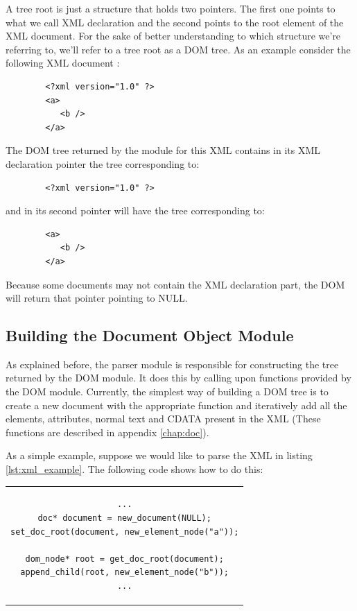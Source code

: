 \documentclass[a4paper]{report}
\begin{document}
	\pagebreak
	A tree root is just a structure that holds two pointers. The first one points to what we call XML declaration and the second points to the root element of the XML document. For the sake of better understanding to which
	structure we're referring to, we'll refer to a tree root as a DOM tree. As an example consider the following XML document	:
	
	\lstset{language=XML,caption=Sample XML file, captionpos=b}
	\begin{lstlisting}
		<?xml version="1.0" ?>
		<a>
		   <b />
		</a>
	\end{lstlisting}
	
	The DOM tree returned by the module for this XML contains in its XML declaration pointer the tree corresponding to:
	\lstset{language=XML,caption=Sample XML declaration, captionpos=b}
	\begin{lstlisting}
		<?xml version="1.0" ?>
	\end{lstlisting}
	
	and in its second pointer will have the tree corresponding to:
	\label{lst:xml_example}
	\lstset{language=XML,caption=Sample XML file without XML declaration, captionpos=b}
	\begin{lstlisting}
		<a>
		   <b />
		</a>
	\end{lstlisting}

	Because some documents may not contain the XML declaration part, the DOM will return that pointer pointing to NULL.		

	\subsection{Building the Document Object Module}
		As explained before, the parser module is responsible for constructing the tree returned by the DOM module. It does this by calling upon functions provided by the DOM module. Currently, the simplest way of building 
		a DOM tree is to create a new document with the appropriate function and iteratively add all the elements, attributes, normal text and CDATA present in the XML (These functions are described in appendix 
		\ref{chap:doc}).
		
		As a simple example, suppose we would like to parse the XML in listing \ref{lst:xml_example}. The following code shows how to do this:

	\begin{center}
	\lstset{language=C,numbers=left, captionpos=b, caption=Sample code to build a DOM tree.}
		\begin{tabular}{c}
	\begin{lstlisting}		
...
doc* document = new_document(NULL);
set_doc_root(document, new_element_node("a"));
	
dom_node* root = get_doc_root(document);
append_child(root, new_element_node("b"));
...
	\end{lstlisting}		
	\end{tabular}
	\end{center}
	
\end{document}
